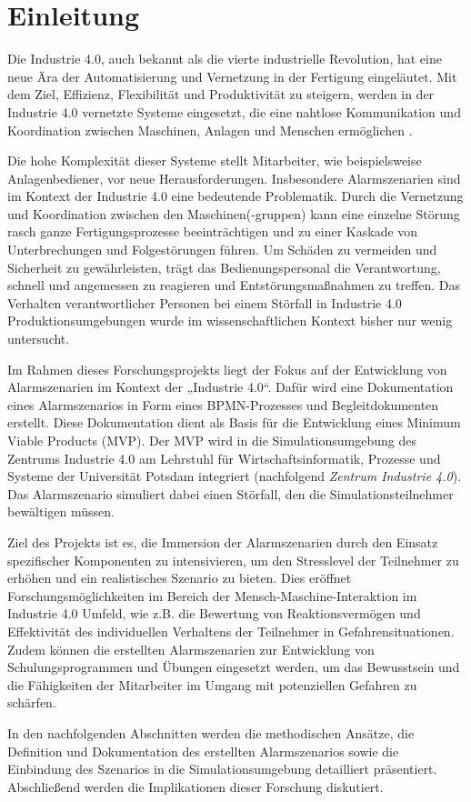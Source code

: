 \section{Einleitung}
Die Industrie 4.0, auch bekannt als die vierte industrielle Revolution, hat eine neue Ära der Automatisierung und Vernetzung in der Fertigung eingeläutet. Mit dem Ziel, Effizienz, Flexibilität und Produktivität zu steigern, werden in der Industrie 4.0 vernetzte Systeme eingesetzt, die eine nahtlose Kommunikation und Koordination zwischen Maschinen, Anlagen und Menschen ermöglichen \autocite{reinheimer}.

Die hohe Komplexität dieser Systeme stellt Mitarbeiter, wie beispielsweise Anlagenbediener, vor neue Herausforderungen. Insbesondere Alarmszenarien sind im Kontext der Industrie 4.0 eine bedeutende Problematik. Durch die Vernetzung und Koordination zwischen den Maschinen(-gruppen) kann eine einzelne Störung rasch ganze Fertigungsprozesse beeinträchtigen und zu einer Kaskade von Unterbrechungen und Folgestörungen führen. Um Schäden zu vermeiden und Sicherheit zu gewährleisten, trägt das Bedienungspersonal die Verantwortung, schnell und angemessen zu reagieren und Entstörungsmaßnahmen zu treffen. Das Verhalten verantwortlicher Personen bei einem Störfall in Industrie 4.0 Produktionsumgebungen wurde im wissenschaftlichen Kontext bisher nur wenig untersucht.

Im Rahmen dieses Forschungsprojekts liegt der Fokus auf der Entwicklung von Alarmszenarien im Kontext der „Industrie 4.0“. Dafür wird eine Dokumentation eines Alarmszenarios in Form eines BPMN-Prozesses und Begleitdokumenten erstellt. Diese Dokumentation dient als Basis für die Entwicklung eines Minimum Viable Products (MVP). Der MVP wird in die Simulationsumgebung des Zentrums Industrie 4.0 am Lehrstuhl für Wirtschaftsinformatik, Prozesse und Systeme der Universität Potsdam integriert (nachfolgend \textit{Zentrum Industrie 4.0}). Das Alarmszenario simuliert dabei einen Störfall, den die Simulationsteilnehmer bewältigen müssen.

Ziel des Projekts ist es, die Immersion der Alarmszenarien durch den Einsatz spezifischer Komponenten zu intensivieren, um den Stresslevel der Teilnehmer zu erhöhen und ein realistisches Szenario zu bieten. Dies eröffnet Forschungsmöglichkeiten im Bereich der Mensch-Maschine-Interaktion im Industrie 4.0 Umfeld, wie z.B. die Bewertung von Reaktionsvermögen und Effektivität des individuellen Verhaltens der Teilnehmer in Gefahrensituationen. Zudem können die erstellten Alarmszenarien zur Entwicklung von Schulungsprogrammen und Übungen eingesetzt werden, um das Bewusstsein und die Fähigkeiten der Mitarbeiter im Umgang mit potenziellen Gefahren zu schärfen.

In den nachfolgenden Abschnitten werden die methodischen Ansätze, die Definition und Dokumentation des erstellten Alarmszenarios sowie die Einbindung des Szenarios in die Simulationsumgebung detailliert präsentiert. Abschließend werden die Implikationen dieser Forschung diskutiert.
\\

\label{section:name-}
